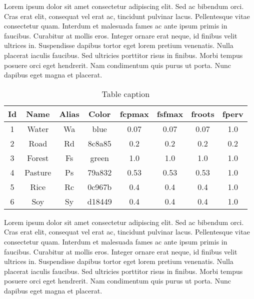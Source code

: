 \documentclass[./main.tex]{subfiles}
\begin{document}
\par Lorem ipsum dolor sit amet consectetur adipiscing elit. Sed ac bibendum orci. Cras erat elit, consequat vel erat ac, tincidunt pulvinar lacus. Pellentesque vitae consectetur quam. Interdum et malesuada fames ac ante ipsum primis in faucibus. Curabitur at mollis eros. Integer ornare erat neque, id finibus velit ultrices in. Suspendisse dapibus tortor eget lorem pretium venenatis. Nulla placerat iaculis faucibus. Sed ultricies porttitor risus in finibus. Morbi tempus posuere orci eget hendrerit. Nam condimentum quis purus ut porta. Nunc dapibus eget magna et placerat.

\begin{table}[h!]
\centering
\caption{Table caption}
\begin{tabular}{| c  c  c  c  c  c  c  c |} 
\hline
\textbf{Id} & \textbf{Name} & \textbf{Alias} & \textbf{Color} & \textbf{fcpmax} & \textbf{fsfmax} & \textbf{froots} & \textbf{fperv}\\ 
\hline
1 & Water & Wa & blue & 0.07 & 0.07 & 0.07 & 1.0\\ 
2 & Road & Rd & 8c8a85 & 0.2 & 0.2 & 0.2 & 0.2\\ 
3 & Forest & Fs & green & 1.0 & 1.0 & 1.0 & 1.0\\ 
4 & Pasture & Ps & 79a832 & 0.53 & 0.53 & 0.53 & 1.0\\ 
5 & Rice & Rc & 0c967b & 0.4 & 0.4 & 0.4 & 1.0\\ 
6 & Soy & Sy & d18449 & 0.4 & 0.4 & 0.4 & 1.0\\ 
\hline
\end{tabular}
\label{table:table}
\end{table}

\par Lorem ipsum dolor sit amet consectetur adipiscing elit. Sed ac bibendum orci. Cras erat elit, consequat vel erat ac, tincidunt pulvinar lacus. Pellentesque vitae consectetur quam. Interdum et malesuada fames ac ante ipsum primis in faucibus. Curabitur at mollis eros. Integer ornare erat neque, id finibus velit ultrices in. Suspendisse dapibus tortor eget lorem pretium venenatis. Nulla placerat iaculis faucibus. Sed ultricies porttitor risus in finibus. Morbi tempus posuere orci eget hendrerit. Nam condimentum quis purus ut porta. Nunc dapibus eget magna et placerat.
\end{document}
